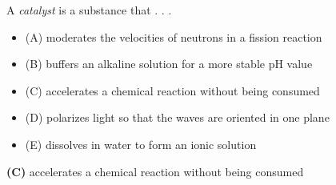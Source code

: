 

A {\it catalyst} is a substance that . . .

\begin{itemize}
\item{(A)} moderates the velocities of neutrons in a fission reaction
\vskip 5pt 
\item{(B)} buffers an alkaline solution for a more stable pH value
\vskip 5pt 
\item{(C)} accelerates a chemical reaction without being consumed
\vskip 5pt 
\item{(D)} polarizes light so that the waves are oriented in one plane
\vskip 5pt 
\item{(E)} dissolves in water to form an ionic solution
\end{itemize}







{\bf (C)} accelerates a chemical reaction without being consumed
 










